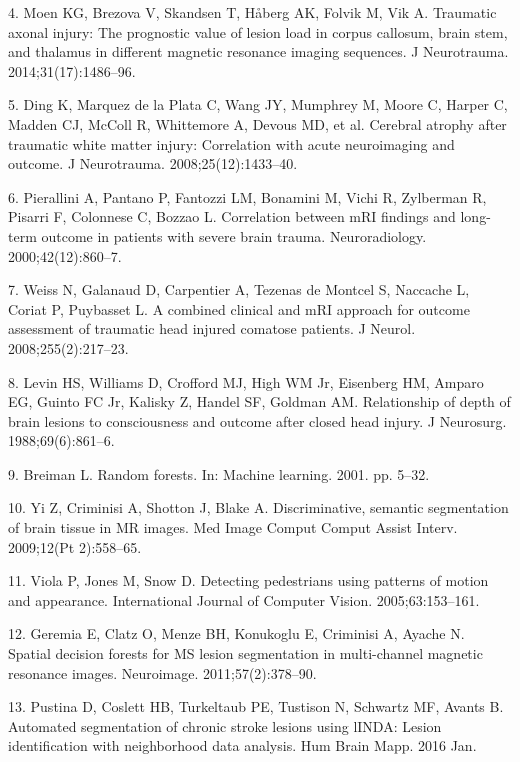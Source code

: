 \documentclass[11pt,]{article}
\begin{document}
\hypertarget{ref-Moen:2014aa}{}
4. Moen KG, Brezova V, Skandsen T, Håberg AK, Folvik M, Vik A. Traumatic
axonal injury: The prognostic value of lesion load in corpus callosum,
brain stem, and thalamus in different magnetic resonance imaging
sequences. J Neurotrauma. 2014;31(17):1486--96.

\hypertarget{ref-Ding:2008aa}{}
5. Ding K, Marquez de la Plata C, Wang JY, Mumphrey M, Moore C, Harper
C, Madden CJ, McColl R, Whittemore A, Devous MD, et al. Cerebral atrophy
after traumatic white matter injury: Correlation with acute neuroimaging
and outcome. J Neurotrauma. 2008;25(12):1433--40.

\hypertarget{ref-Pierallini:2000aa}{}
6. Pierallini A, Pantano P, Fantozzi LM, Bonamini M, Vichi R, Zylberman
R, Pisarri F, Colonnese C, Bozzao L. Correlation between mRI findings
and long-term outcome in patients with severe brain trauma.
Neuroradiology. 2000;42(12):860--7.

\hypertarget{ref-Weiss:2008aa}{}
7. Weiss N, Galanaud D, Carpentier A, Tezenas de Montcel S, Naccache L,
Coriat P, Puybasset L. A combined clinical and mRI approach for outcome
assessment of traumatic head injured comatose patients. J Neurol.
2008;255(2):217--23.

\hypertarget{ref-Levin:1988aa}{}
8. Levin HS, Williams D, Crofford MJ, High WM Jr, Eisenberg HM, Amparo
EG, Guinto FC Jr, Kalisky Z, Handel SF, Goldman AM. Relationship of
depth of brain lesions to consciousness and outcome after closed head
injury. J Neurosurg. 1988;69(6):861--6.

\hypertarget{ref-breiman2001}{}
9. Breiman L. Random forests. In: Machine learning. 2001. pp. 5--32.

\hypertarget{ref-yi2009}{}
10. Yi Z, Criminisi A, Shotton J, Blake A. Discriminative, semantic
segmentation of brain tissue in MR images. Med Image Comput Comput
Assist Interv. 2009;12(Pt 2):558--65.

\hypertarget{ref-viola2005}{}
11. Viola P, Jones M, Snow D. Detecting pedestrians using patterns of
motion and appearance. International Journal of Computer Vision.
2005;63:153--161.

\hypertarget{ref-geremia2011}{}
12. Geremia E, Clatz O, Menze BH, Konukoglu E, Criminisi A, Ayache N.
Spatial decision forests for MS lesion segmentation in multi-channel
magnetic resonance images. Neuroimage. 2011;57(2):378--90.

\hypertarget{ref-Pustina:2016aa}{}
13. Pustina D, Coslett HB, Turkeltaub PE, Tustison N, Schwartz MF,
Avants B. Automated segmentation of chronic stroke lesions using lINDA:
Lesion identification with neighborhood data analysis. Hum Brain Mapp.
2016 Jan.
\end{document}
